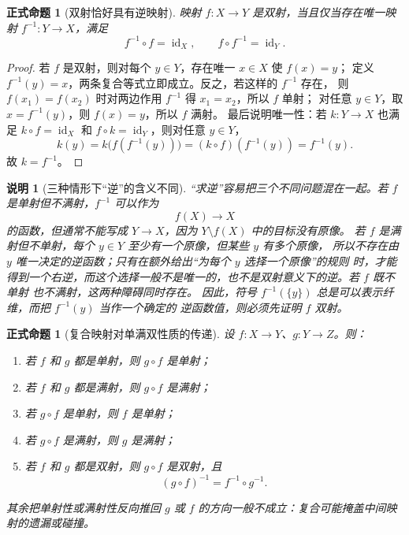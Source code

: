 \documentclass[UTF8,fontset=none,a4paper,11pt]{ctexart}
\theoremstyle{foundation-definition}
\theoremstyle{foundation-theorem}
\theoremstyle{foundation-proposition}
\newtheorem{proposition}[definition]{正式命题}
\theoremstyle{foundation-example}
\theoremstyle{foundation-remark}
\newtheorem{remark}[definition]{说明}
\theoremstyle{foundation-theorem}
\begin{document}
\begin{proposition}[双射恰好具有逆映射]\label{prop:bijective-inverse}
映射 \(f:X\to Y\) 是双射，当且仅当存在唯一映射 \(f^{-1}:Y\to X\)，满足
\[
f^{-1}\circ f=\operatorname{id}_X,\qquad
f\circ f^{-1}=\operatorname{id}_Y.
\]
\end{proposition}

\begin{proof}
若 \(f\) 是双射，则对每个 \(y\in Y\)，存在唯一 \(x\in X\) 使 \(f(x)=y\)；
定义 \(f^{-1}(y)=x\)，两条复合等式立即成立。反之，若这样的 \(f^{-1}\) 存在，
则 \(f(x_1)=f(x_2)\) 时对两边作用 \(f^{-1}\) 得 \(x_1=x_2\)，所以 \(f\) 单射；
对任意 \(y\in Y\)，取 \(x=f^{-1}(y)\)，则 \(f(x)=y\)，所以 \(f\) 满射。
最后说明唯一性：若 \(k:Y\to X\) 也满足
\(k\circ f=\operatorname{id}_X\) 和 \(f\circ k=\operatorname{id}_Y\)，则对任意 \(y\in Y\)，
\[
  k(y)=k\bigl(f(f^{-1}(y))\bigr)
      =(k\circ f)(f^{-1}(y))=f^{-1}(y).
\]
故 \(k=f^{-1}\)。
\end{proof}

\begin{remark}[三种情形下“逆”的含义不同]\label{rem:inverse-three-cases}
“求逆”容易把三个不同问题混在一起。若 \(f\) 是单射但不满射，\(f^{-1}\) 可以作为
\[
f(X)\longrightarrow X
\]
的函数，但通常不能写成 \(Y\to X\)，因为 \(Y\setminus f(X)\) 中的目标没有原像。
若 \(f\) 是满射但不单射，每个 \(y\in Y\) 至少有一个原像，但某些 \(y\) 有多个原像，
所以不存在由 \(y\) 唯一决定的逆函数；只有在额外给出“为每个 \(y\) 选择一个原像”的规则
时，才能得到一个右逆，而这个选择一般不是唯一的，也不是双射意义下的逆。若 \(f\) 既不单射
也不满射，这两种障碍同时存在。
因此，符号 \(f^{-1}(\{y\})\) 总是可以表示纤维，而把 \(f^{-1}(y)\) 当作一个确定的
逆函数值，则必须先证明 \(f\) 双射。
\end{remark}

\begin{proposition}[复合映射对单满双性质的传递]\label{prop:composition-function-types}
设 \(f:X\to Y\)、\(g:Y\to Z\)。则：
\begin{enumerate}[label=(\alph*)]
  \item 若 \(f\) 和 \(g\) 都是单射，则 \(g\circ f\) 是单射；
  \item 若 \(f\) 和 \(g\) 都是满射，则 \(g\circ f\) 是满射；
  \item 若 \(g\circ f\) 是单射，则 \(f\) 是单射；
  \item 若 \(g\circ f\) 是满射，则 \(g\) 是满射；
  \item 若 \(f\) 和 \(g\) 都是双射，则 \(g\circ f\) 是双射，且
  \[
    (g\circ f)^{-1}=f^{-1}\circ g^{-1}.
  \]
\end{enumerate}
其余把单射性或满射性反向推回 \(g\) 或 \(f\) 的方向一般不成立：复合可能掩盖中间映射的遗漏或碰撞。
\end{proposition}
\end{document}
